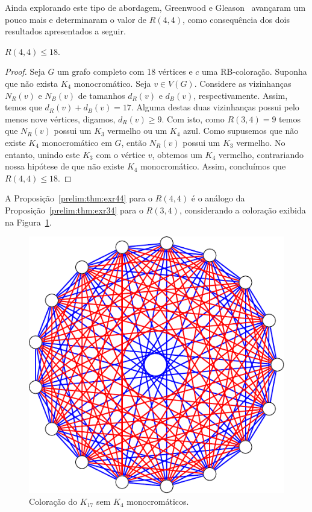 Ainda explorando este tipo de abordagem, Greenwood e Gleason~\cite{greenwood} avançaram um pouco mais e determinaram o valor de $R(4,4)$, como consequência dos dois resultados apresentados a seguir.

\begin{proposition}
\label{prelim:thm:r44}
$R(4,4) \leq 18$.
\end{proposition}
\begin{proof}
Seja $G$ um grafo completo com 18 vértices e $c$ uma RB-coloração. Suponha que não exista $K_4$ monocromático. Seja $v \in V(G)$. Considere as vizinhanças $N_R(v)$ e $N_B(v)$ de tamanhos $d_R(v)$ e $d_B(v)$, respectivamente. Assim, temos que $d_R(v) + d_B(v) = 17$. Alguma destas duas vizinhanças possui pelo menos nove vértices, digamos, $d_R(v) \geq 9$. Com isto, como $R(3,4) = 9$ temos que $N_R(v)$ possui um $K_3$ vermelho ou um $K_4$ azul. Como supusemos que não existe $K_4$ monocromático em $G$, então $N_R(v)$ possui um $K_3$ vermelho.
No entanto, unindo este $K_3$ com o vértice $v$, obtemos um $K_4$ vermelho, contrariando nossa hipótese de que não existe $K_4$ monocromático. Assim, concluímos que $R(4,4) \leq 18$.
\end{proof}

A Proposição~\ref{prelim:thm:exr44} para o $R(4,4)$ é o análogo da Proposição~\ref{prelim:thm:exr34} para o $R(3,4)$, considerando a coloração exibida na Figura~\ref{prelim:fig:exr44}.

\begin{figure}[ht!]
\centering
\includegraphics{figures/2_prelim_2_r44lb}
\caption{Coloração do $K_{17}$ sem $K_4$ monocromáticos.}
\label{prelim:fig:exr44}
\end{figure}

